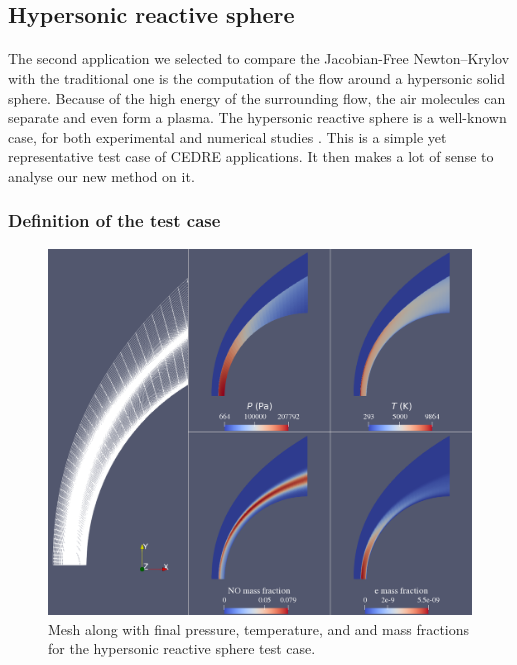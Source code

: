     \subsection{Hypersonic reactive sphere}

      \paragraph{}
      The second application we selected to compare the Jacobian-Free Newton--Krylov with the traditional one is the computation of the flow around a hypersonic solid sphere.
      Because of the high energy of the surrounding flow, the air molecules can separate and even form a plasma.
      The hypersonic reactive sphere is a well-known case, for both experimental \cite{Lobb1964} and numerical studies \cite{DobrovGimadievKarpenkoEtAl2022}.
      This is a simple yet representative test case of CEDRE applications.
      It then makes a lot of sense to analyse our new method on it.

      \subsubsection{Definition of the test case}

        \begin{figure}
          \centering
          \includegraphics[width=\textwidth]{figures/sphere_fields.png}
          \caption{Mesh along with final pressure, temperature, and  and  mass fractions for the hypersonic reactive sphere test case.}
          \label{fig:sphere_fields}
        \end{figure}

